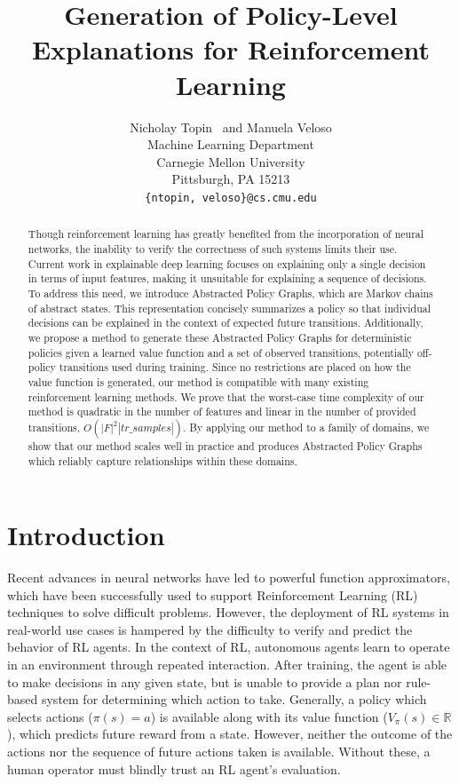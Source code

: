 \documentclass[letterpaper]{article} %
\begin{document}
%
\title{Generation of Policy-Level Explanations for Reinforcement Learning}
\author{
Nicholay Topin \ and Manuela Veloso \\
Machine Learning Department\\
Carnegie Mellon University\\
Pittsburgh, PA 15213 \\
\texttt{\{ntopin, veloso\}@cs.cmu.edu} \\
}
\maketitle
\begin{abstract}
Though reinforcement learning has greatly benefited from the incorporation of neural networks, the inability to verify the correctness of such systems limits their use.
Current work in explainable deep learning focuses on explaining only a single decision in terms of input features, making it unsuitable for explaining a sequence of decisions.
To address this need, we introduce Abstracted Policy Graphs, which are Markov chains of abstract states.
This representation concisely summarizes a policy so that individual decisions can be explained in the context of expected future transitions.
Additionally, we propose a method to generate these Abstracted Policy Graphs for deterministic policies given a learned value function and a set of observed transitions, potentially off-policy transitions used during training.
Since no restrictions are placed on how the value function is generated, our method is compatible with many existing reinforcement learning methods.
We prove that the worst-case time complexity of our method is quadratic in the number of features and linear in the number of provided transitions, $O(|F|^2 |tr\_samples|)$.
By applying our method to a family of domains, we show that our method scales well in practice and produces Abstracted Policy Graphs which reliably capture relationships within these domains.
\end{abstract}

\section{Introduction}
Recent advances in neural networks have led to powerful function approximators, which have been successfully used to support Reinforcement Learning (RL) techniques to solve difficult problems.
However, the deployment of RL systems in real-world use cases is hampered by the difficulty to verify and predict the behavior of RL agents.
In the context of RL, autonomous agents learn to operate in an environment through repeated interaction.
After training, the agent is able to make decisions in any given state, but is unable to provide a plan nor rule-based system for determining which action to take.
Generally, a policy  which selects actions ($\pi(s) = a$) is available along with its value function ($V_{\pi}(s) \in \mathbb{R}$), which predicts future reward from a state.
However, neither the outcome of the actions nor the sequence of future actions taken is available.
Without these, a human operator must blindly trust an RL agent's evaluation.
\end{document}
